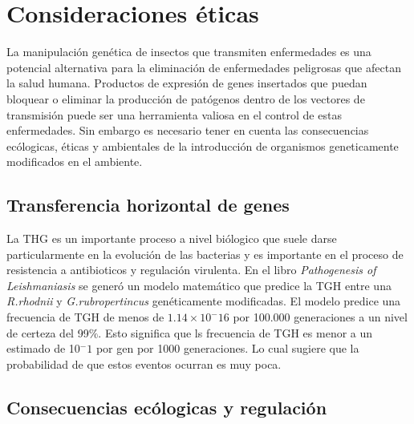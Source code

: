 \documentclass[12pt]{article}
\numberwithin{equation}{section}
\begin{document}
\section{Consideraciones éticas}

La manipulación genética de insectos que transmiten enfermedades es una potencial alternativa para la eliminación de enfermedades peligrosas que afectan la salud humana. Productos de expresión de genes insertados que puedan bloquear o eliminar la producción de patógenos dentro de los vectores de transmisión puede ser una herramienta valiosa en el control de estas enfermedades. Sin embargo es necesario tener en cuenta las consecuencias ecólogicas, éticas y ambientales de la introducción de organismos geneticamente modificados en el ambiente.


\subsection{Transferencia horizontal de genes}

La THG es un importante proceso a nivel biólogico que suele darse particularmente en la evolución de las bacterias y es importante en el proceso de resistencia a antibioticos y regulación virulenta. En el libro \textit{Pathogenesis of Leishmaniasis} se generó un modelo matemático que predice la TGH entre una \textit{R.rhodnii} y \textit{G.rubropertincus} genéticamente modificadas. El modelo predice una frecuencia de TGH de menos de $1.14 \times 10^-16$ por 100.000 generaciones a un nivel de certeza del 99$\%$. Esto significa que ls frecuencia de TGH es menor a un estimado de 10$^-1$ por gen por 1000 generaciones. Lo cual sugiere que la probabilidad de que estos eventos ocurran es muy poca. 	


\subsection{Consecuencias ecólogicas y regulación}
\end{document}
